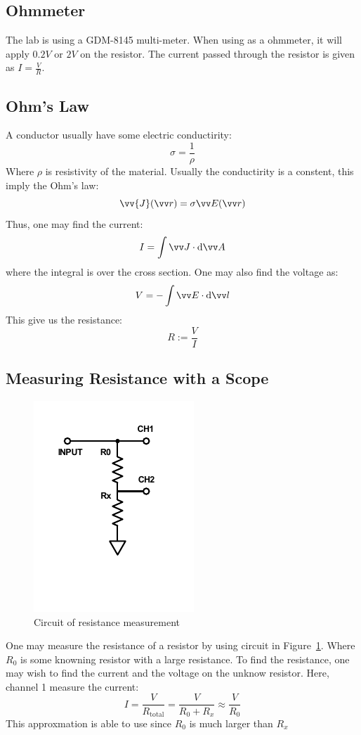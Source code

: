 \documentclass[aps,prl,reprint]{revtex4-1}
\newcommand{\de}{\mathrm{d}}
\begin{document}
    \subsection{Ohmmeter}
    The lab is using a GDM-8145 multi-meter. When using as a ohmmeter, it will apply $0.2V$ or $2V$ on the resistor\cite{dmm}. The current passed through the resistor is given as $I = \frac{V}{R}$.
    \subsection{Ohm's Law}
    A conductor usually have some electric conductirity:
    \[
    \sigma = \frac{1}{\rho}
    \]
    Where $\rho$ is resistivity of the material. Usually the conductirity is a constent, this imply the Ohm's law:
    \[
    \vv{J}(\vv r) = \sigma \vv E (\vv r)
    \]
    Thus, one may find the current:
    \[
    I = \int \vv J \cdot \de \vv A
    \]
    where the integral is over the cross section. One may also find the voltage as:
    \[
    V = - \int \vv E \cdot \de \vv l
    \]
    This give us the resistance:
    \[
    R := \frac{V}{I}
    \]

    \subsection{Measuring Resistance with a Scope}
    \begin{figure}[h]
        \centering
        \includegraphics{images/plot1.pdf}
        \caption{Circuit of resistance measurement}
        \label{fig:1}
    \end{figure}
    One may measure the resistance of a resistor by using circuit in Figure~\ref{fig:1}. Where $R_0$ is some knowning resistor with a large resistance. To find the resistance, one may wish to find the current and the voltage on the unknow resistor. Here, channel 1 measure the current:
    \[
    I = \frac{V}{R_\text{total}} = \frac{V}{R_0 + R_x} \approx \frac{V}{R_0}
    \]
    This approxmation is able to use since $R_0$ is much larger than $R_x$
\end{document}
